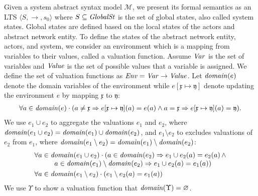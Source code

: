 Given a system abstract syntax model $\mathcal{M}$, we present its formal semantics as an LTS $\langle S,\rightarrow,s_0 \rangle$ where $S\subseteq \mathit{GlobalSt}$ %
is the set of global states, also called system states. Global states are defined based on the local states of the actors and abstract network entity. To define the states of the abstract network entity, actors, and system, we consider an environment which is a mapping from variables to their values, called a valuation function. Assume $\mathit{Var}$ is the set of variables and $\mathit{Value}$ is the set of possible values that a variable is assigned. We define the set of valuation functions as  $\mathit{Env}=\mathit{Var} \rightarrow \mathit{Value}$. Let $\mathit{domain}(e)$ denote the domain variables of the environment while $e[\mathfrak{x}\mapsto\mathfrak{y}]$ denote updating the environment $e$ by mapping $\mathfrak{x}$ to $\mathfrak{y}$:\[
\begin{array}{l}
\forall a\in\mathit{domain}(e)\cdot(a\neq\mathfrak{x}\Rightarrow e[\mathfrak{x}\mapsto\mathfrak{y}](a)=e(a) \wedge a=\mathfrak{x}\Rightarrow e[\mathfrak{x}\mapsto\mathfrak{y}](a)=\mathfrak{y}).
\end{array}
\]We use $e_1\cup e_2$ to aggregate the valuations $e_1$ and $e_2$, where $\mathit{domain}(e_1\cup e_2)=\mathit{domain}(e_1)\cup\mathit{domain}(e_2)$, and $e_1\setminus e_2$ to excludes valuations of $e_2$ from $e_1$, where $\mathit{domain}(e_1\setminus e_2)=\mathit{domain}(e_1)\setminus\mathit{domain}(e_2)$:\[
\begin{array}{l} 
\forall a\in\domain(e_1 \cup e_2)\cdot(a\in \domain(e_2)\Rightarrow e_1\cup e_2(a) = e_2(a) \,\wedge \\ \hspace*{1cm} a\in \domain(e_1)\setminus\domain(e_2)\Rightarrow e_1\cup e_2(a) = e_1(a))\vspace*{1mm}\\
\forall a\in\domain(e_1 \setminus e_2)\cdot( e_1\setminus e_2(a) = e_1(a)) 
\end{array}
\]We use $\Upsilon$ to show a valuation function that $\mathit{domain}(\Upsilon)=\varnothing$.

